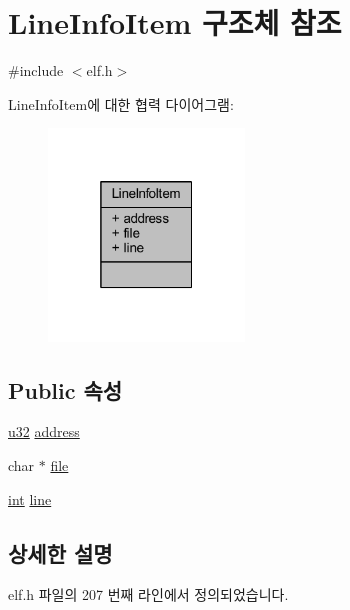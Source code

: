 \hypertarget{struct_line_info_item}{}\section{Line\+Info\+Item 구조체 참조}
\label{struct_line_info_item}


{\ttfamily \#include $<$elf.\+h$>$}



Line\+Info\+Item에 대한 협력 다이어그램\+:\nopagebreak
\begin{figure}[H]
\begin{center}
\leavevmode
\includegraphics[width=148pt]{struct_line_info_item__coll__graph}
\end{center}
\end{figure}
\subsection*{Public 속성}
\begin{DoxyCompactItemize}
\item 
\mbox{\hyperlink{_system_8h_a10e94b422ef0c20dcdec20d31a1f5049}{u32}} \mbox{\hyperlink{struct_line_info_item_aa5147adab5d2634bec7965619b5773ab}{address}}
\item 
char $\ast$ \mbox{\hyperlink{struct_line_info_item_a61a140c862884d34fbf8e13e16ee17af}{file}}
\item 
\mbox{\hyperlink{_util_8cpp_a0ef32aa8672df19503a49fab2d0c8071}{int}} \mbox{\hyperlink{struct_line_info_item_aa1c188f0239f74291b066489d1bc86c2}{line}}
\end{DoxyCompactItemize}


\subsection{상세한 설명}


elf.\+h 파일의 207 번째 라인에서 정의되었습니다.



